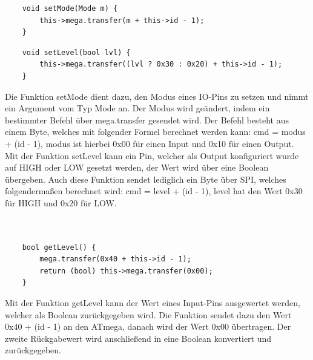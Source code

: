\documentclass[12pt]{article}
\begin{document}
\begin{verbatim}
    void setMode(Mode m) {
        this->mega.transfer(m + this->id - 1);
    }
\end{verbatim}
\begin{verbatim}
    void setLevel(bool lvl) {
        this->mega.transfer((lvl ? 0x30 : 0x20) + this->id - 1);
    }
\end{verbatim}
Die Funktion setMode dient dazu, den Modus eines IO-Pins zu setzen und nimmt ein Argument vom Typ Mode an. Der Modus wird geändert, indem ein bestimmter Befehl über mega.transfer gesendet wird. Der Befehl besteht aus einem Byte, welches mit folgender Formel berechnet werden kann: cmd = modus + (id - 1), modus ist hierbei 0x00 für einen Input und 0x10 für einen Output.\\
Mit der Funktion setLevel kann ein Pin, welcher als Output konfiguriert wurde auf HIGH oder LOW gesetzt werden, der Wert wird über eine Boolean übergeben. Auch diese Funktion sendet lediglich ein Byte über SPI, welches folgendermaßen berechnet wird: cmd = level + (id - 1), level hat den Wert 0x30 für HIGH und 0x20 für LOW.\\\\\\
\begin{verbatim}
    bool getLevel() {
        mega.transfer(0x40 + this->id - 1);
        return (bool) this->mega.transfer(0x00);
    }
\end{verbatim}
Mit der Funktion getLevel kann der Wert eines Input-Pins ausgewertet werden, welcher als Boolean zurückgegeben wird. Die Funktion sendet dazu den Wert 0x40 + (id - 1) an den ATmega, danach wird der Wert 0x00 übertragen. Der zweite Rückgabewert wird anschließend in eine Boolean konvertiert und zurückgegeben.
\end{document}
